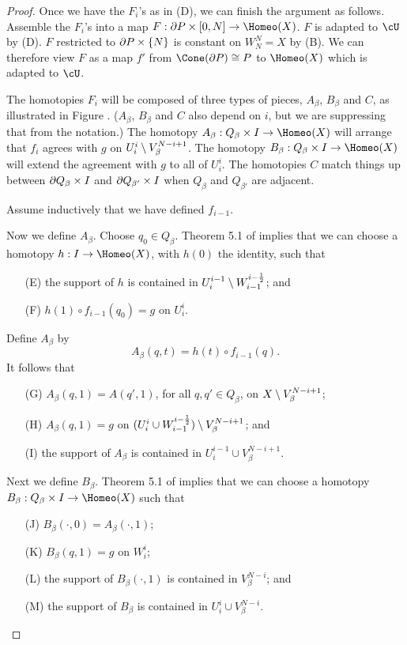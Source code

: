 \begin{proof}
Once we have the $F_i$'s as in (D), we can finish the argument as follows.
Assemble the $F_i$'s into a map $F: \bd P\times [0,N] \to \Homeo(X)$.
$F$ is adapted to $\cU$ by (D).
$F$ restricted to $\partial P\times\{N\}$ is constant on $W_N^N = X$ by (B).
We can therefore view $F$ as a map $f'$ from $\Cone(\bd P) \cong P$ to $\Homeo(X)$
which is adapted to $\cU$.

The homotopies $F_i$ will be composed of three types of pieces, $A_\beta$, $B_\beta$ and $C$, %
as illustrated in Figure .
($A_\beta$, $B_\beta$ and $C$ also depend on $i$, but we are suppressing that from the notation.)
The homotopy $A_\beta : Q_\beta \times I \to \Homeo(X)$ will arrange that $f_i$ agrees with $g$
on $U_i^i \setminus V_\beta^{N-i+1}$.
The homotopy $B_\beta : Q_\beta \times I \to \Homeo(X)$ will extend the agreement with $g$ to all of $U_i^i$.
The homotopies $C$ match things up between $\partial Q_\beta \times I$ and $\partial Q_{\beta'} \times I$ when
$Q_\beta$ and $Q_{\beta'}$ are adjacent.

Assume inductively that we have defined $f_{i-1}$.

Now we define $A_\beta$.
Choose $q_0\in Q_\beta$.
Theorem 5.1 of \cite{MR0283802} implies that we can choose a homotopy $h:I \to \Homeo(X)$, with $h(0)$ the identity, such that
\begin{itemize}
\item[(E)] the support of $h$ is contained in $U_i^{i-1} \setminus W_{i-1}^{i-\frac12}$; and
\item[(F)] $h(1) \circ f_{i-1}(q_0) = g$ on $U_i^i$.
\end{itemize}
Define $A_\beta$ by
\[
	A_\beta(q, t) = h(t) \circ f_{i-1}(q) .
\]
It follows that
\begin{itemize}
\item[(G)] $A_\beta(q,1) = A(q',1)$, for all $q,q' \in Q_\beta$, on $X \setminus V_\beta^{N-i+1}$;
\item[(H)] $A_\beta(q, 1) = g$ on $(U_i^i \cup W_{i-1}^{i-\frac12})\setminus V_\beta^{N-i+1}$; and
\item[(I)] the support of $A_\beta$ is contained in $U_i^{i-1} \cup V_\beta^{N-i+1}$.
\end{itemize}

Next we define $B_\beta$.
Theorem 5.1 of \cite{MR0283802} implies that we can choose a homotopy $B_\beta:Q_\beta\times I\to \Homeo(X)$
such that
\begin{itemize}
\item[(J)] $B_\beta(\cdot, 0) = A_\beta(\cdot, 1)$;
\item[(K)] $B_\beta(q,1) = g$ on $W_i^i$;
\item[(L)] the support of $B_\beta(\cdot,1)$ is contained in $V_\beta^{N-i}$; and
\item[(M)] the support of $B_\beta$ is contained in $U_i^i \cup V_\beta^{N-i}$.
\end{itemize}


\end{proof}
